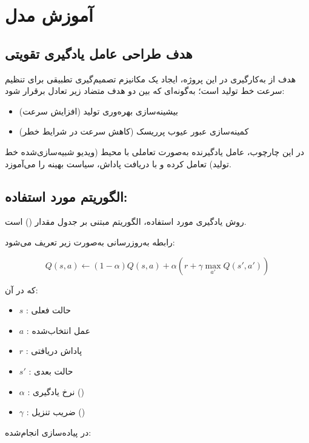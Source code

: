\documentclass[a4paper, 10pt, twocolumn]{article}
\begin{document}
	\section{آموزش مدل }
	\subsection{هدف طراحی عامل یادگیری تقویتی}
	
	هدف از به‌کارگیری  در این پروژه، ایجاد یک مکانیزم تصمیم‌گیری تطبیقی برای تنظیم سرعت خط تولید است؛ به‌گونه‌ای که بین دو هدف متضاد زیر تعادل برقرار شود:
	
	\begin{itemize}
		\item بیشینه‌سازی بهره‌وری تولید (افزایش سرعت)
		\item کمینه‌سازی عبور عیوب پرریسک (کاهش سرعت در شرایط خطر)
	\end{itemize}
	
	در این چارچوب، عامل یادگیرنده به‌صورت تعاملی با محیط (ویدیو شبیه‌سازی‌شده خط تولید) تعامل کرده و با دریافت پاداش، سیاست بهینه را می‌آموزد.
	
	\vspace{1em}
	
	\subsection{الگوریتم مورد استفاده: }
	
	روش یادگیری مورد استفاده، الگوریتم  مبتنی بر جدول مقدار () است.
	
	رابطه به‌روزرسانی به‌صورت زیر تعریف می‌شود:
	
	\[
	Q(s,a) \leftarrow (1-\alpha)Q(s,a) + \alpha \left( r + \gamma \max_{a'} Q(s',a') \right)
	\]
	
	که در آن:
	
	\begin{itemize}
		\item $s$ : حالت فعلی
		\item $a$ : عمل انتخاب‌شده
		\item $r$ : پاداش دریافتی
		\item $s'$ : حالت بعدی
		\item $\alpha$ : نرخ یادگیری ()
		\item $\gamma$ : ضریب تنزیل ()
	\end{itemize}
	
	در پیاده‌سازی انجام‌شده:
	
\end{document}
